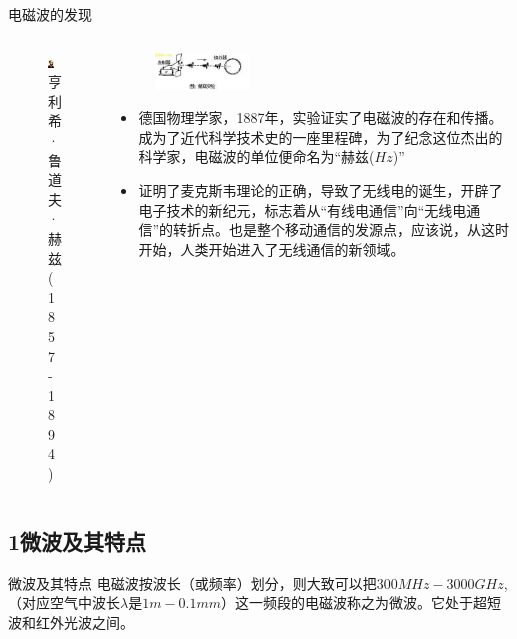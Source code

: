 \documentclass{beamer}
\begin{document}
\begin{frame}{电磁波的发现}
  \begin{columns}
    \begin{column}{0.35\linewidth}
      \begin{figure}
        \includegraphics[width=3cm]{hertz.jpg}
        \caption{亨利希·鲁道夫·赫兹(1857 - 1894)}
      \end{figure}
    \end{column}
    \begin{column}{0.65\linewidth}
      \begin{figure}
        \flushright
        \includegraphics[width=2.5cm]{hertzexperiment.jpg}
      \end{figure}
      \begin{itemize}
        \item 德国物理学家，1887年，实验证实了电磁波的存在和传播。成为了近代科学技术史的一座里程碑，为了纪念这位杰出的科学家，电磁波的单位便命名为“赫兹($Hz$)”
        \item 证明了麦克斯韦理论的正确，导致了无线电的诞生，开辟了电子技术的新纪元，标志着从“有线电通信”向“无线电通信”的转折点。也是整个移动通信的发源点，应该说，从这时开始，人类开始进入了无线通信的新领域。
      \end{itemize}
    \end{column}
  \end{columns}
\end{frame}

\subsection{1\quad 微波及其特点}
\begin{frame}{微波及其特点}
  电磁波按波长（或频率）划分，则大致可以把$300MHz - 3000GHz$,（对应空气中波长$\lambda$是$1m - 0.1mm$）这一频段的电磁波称之为微波。它处于超短波和红外光波之间。
\end{frame}
\end{document}
